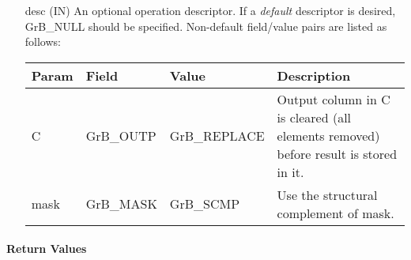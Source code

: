 \begin{itemize}[leftmargin=1.1in]
    \item[{\sf desc}] ({\sf IN}) An optional operation descriptor. If
    a \emph{default} descriptor is desired, {\sf GrB\_NULL} should be
    specified. Non-default field/value pairs are listed as follows:  \\

    \begin{tabular}{lllp{2.5in}}
        Param & Field  & Value & Description \\
        \hline
        {\sf C}    & {\sf GrB\_OUTP} & {\sf GrB\_REPLACE} &  Output column in 
        {\sf C} is cleared (all elements removed) before result is stored in it.\\

        {\sf mask} & {\sf GrB\_MASK} & {\sf GrB\_SCMP}   & Use the structural
        complement of {\sf mask}. \\
    \end{tabular}
\end{itemize}

\paragraph{Return Values}

